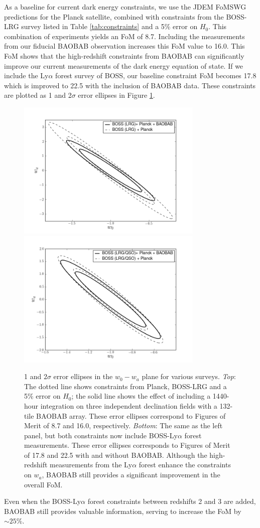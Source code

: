 \documentclass[10pt,iop]{emulateapj}
\begin{document}
As a baseline for current dark energy constraints,
we use the JDEM FoMSWG predictions for the Planck satellite, combined with constraints from the 
BOSS-LRG survey listed in Table \ref{tab:constraints} and a 5\% error on $H_0$.  
This combination of experiments yields an FoM
of 8.7.  Including the measurements from our fiducial BAOBAB observation increases this
FoM value to 16.0.  This FoM
shows that the high-redshift constraints from BAOBAB can significantly improve our current
measurements of the dark energy equation of state.  If we include the Ly$\alpha$ forest
survey of BOSS, our baseline constraint FoM becomes 17.8 which is improved to 22.5 with the inclusion
of BAOBAB data.  These constraints are plotted as 1 and 2$\sigma$ error ellipses in Figure
\ref{fig:fish}.  
\begin{figure}\centering
\includegraphics[width=3.5in]{fishmat_nolya.png}
\includegraphics[width=3.5in]{fishmat_lya.png}
\caption{1 and $2\sigma$ error ellipses in the $w_0-w_a$ plane for various surveys.  \emph{Top}: The dotted line shows constraints from Planck, BOSS-LRG and a 5\% error on $H_0$; the solid line shows the effect of including a 1440-hour integration on three independent declination fields with a 132-tile BAOBAB array.  These error ellipses correspond to Figures of Merit of 8.7 and 16.0, respectively.  \emph{Bottom}: The same as the left panel, but both constraints now include BOSS-Ly$\alpha$ forest measurements.  These error ellipses corresponds to Figures of Merit of 17.8 and 22.5 with and without BAOBAB.  Although the high-redshift measurements from the Ly$\alpha$ forest enhance the constraints on $w_a$, BAOBAB still provides a significant improvement in the overall FoM.}
\label{fig:fish}
\end{figure}
Even when the BOSS-Ly$\alpha$ forest constraints between redshifts 2 and 3 are 
added, BAOBAB still provides valuable information, serving to increase the FoM by $\sim 25\%$.
\end{document}
